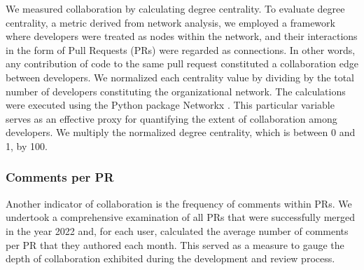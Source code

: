 \documentclass[
  sn-mathphys-ay,
]{sn-jnl}
\begin{document}
We measured collaboration by calculating degree centrality. To evaluate
degree centrality, a metric derived from network analysis, we employed a
framework where developers were treated as nodes within the network, and
their interactions in the form of Pull Requests (PRs) were regarded as
connections. In other words, any contribution of code to the same pull
request constituted a collaboration edge between developers. We
normalized each centrality value by dividing by the total number of
developers constituting the organizational network. The calculations
were executed using the Python package Networkx
\citep{SciPyProceedings_11}. This particular variable serves as an
effective proxy for quantifying the extent of collaboration among
developers. We multiply the normalized degree centrality, which is
between 0 and 1, by 100.

\subsubsection{Comments per PR}\label{comments-per-pr}

Another indicator of collaboration is the frequency of comments within
PRs. We undertook a comprehensive examination of all PRs that were
successfully merged in the year 2022 and, for each user, calculated the
average number of comments per PR that they authored each month. This
served as a measure to gauge the depth of collaboration exhibited during
the development and review process.
\end{document}
